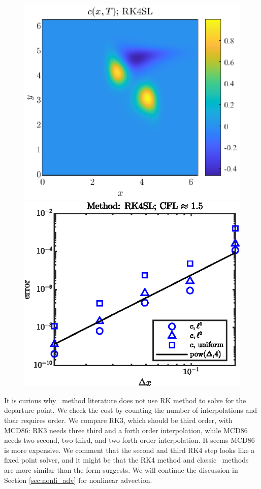 \documentclass[11pt,letterpaper]{article}
\begin{document}
\begin{figure}[H]
    \centering
    \includegraphics{figs/c_final_RK4SL}
    \includegraphics{figs/conv_order_RK4SL}
    \caption{}\label{fig:c_final_RK4SL}
\end{figure}
It is curious why \sml\ method literature does not use RK method to solve for the departure point. We check the cost by counting the number of interpolations and their requires order. We compare RK3, which should be third order, with MCD86: RK3 needs three third and a forth order interpolation, while MCD86 needs two second, two third, and two forth order interpolation. It seems MCD86 is more expensive. We comment that the second and third RK4 step looks like a fixed point solver, and it might be that the RK4 method and classic \sml\ methods are more similar than the form suggests. We will continue the discussion in Section \ref{sec:nonli_adv} for nonlinear advection. 
\end{document}
